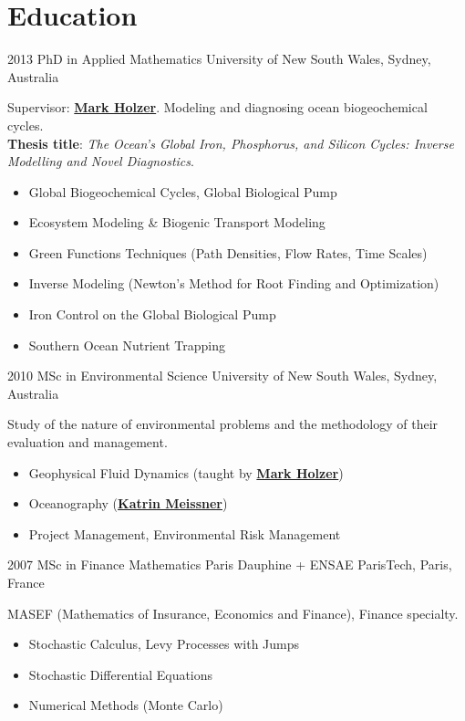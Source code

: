 \documentclass[12pt]{friggeri-cv}
\begin{document}
\newpage
\section{Education}
\begin{entrylist}
  \entry
    {2013}
    {PhD in Applied Mathematics}
    {University of New South Wales, Sydney, Australia}
    {Supervisor: \hyperref[MH]{\textbf{Mark Holzer}}.
    Modeling and diagnosing ocean biogeochemical cycles.\\
    \textbf{Thesis title}: \emph{The Ocean's Global Iron, Phosphorus, and Silicon Cycles: Inverse Modelling and Novel Diagnostics}.
    \begin{itemize}
        \item Global Biogeochemical Cycles, Global Biological Pump
        \item Ecosystem Modeling \& Biogenic Transport Modeling
        \item Green Functions Techniques (Path Densities, Flow Rates, Time Scales)
        \item Inverse Modeling (Newton's Method for Root Finding and Optimization)
        \item Iron Control on the Global Biological Pump
        \item Southern Ocean Nutrient Trapping
    \end{itemize}
    }

  \entry
    {2010}
    {MSc in Environmental Science}
    {University of New South Wales, Sydney, Australia}
    {Study of the nature of environmental problems and the methodology of their evaluation and management.
    \begin{itemize}
      \item Geophysical Fluid Dynamics (taught by \hyperref[MH]{\textbf{Mark Holzer}})
      \item Oceanography (\hyperref[KM]{\textbf{Katrin Meissner}})
      \item Project Management, Environmental Risk Management
    \end{itemize}
    }

  \entry
    {2007}
    {MSc in Finance Mathematics}
    {Paris Dauphine + ENSAE ParisTech, Paris, France}
    {MASEF (Mathematics of Insurance, Economics and Finance), Finance specialty.
    \begin{itemize}
        \item Stochastic Calculus, Levy Processes with Jumps
        \item Stochastic Differential Equations
        \item Numerical Methods (Monte Carlo)
    \end{itemize}
    }


\end{entrylist}
\end{document}

